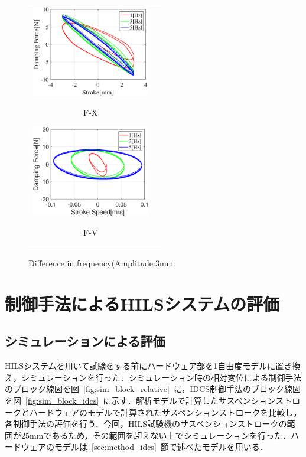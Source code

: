 \documentclass[a4paper,12pt]{article_vdlab_sotsuron}
\begin{document}
\vspace*{10mm}
\begin{figure}[h]
  \begin{tabular}{cc}
  \begin{minipage}{0.5\hsize}
  \begin{center}
    \includegraphics[height=40mm]{figure/damper_3_x_Fx.eps}
    \end{center}
    \begin{center}
    \ F-X\
    \end{center}
  \end{minipage}
  \begin{minipage}{0.5\hsize}
     \begin{center}
      \includegraphics[height=40mm]{figure/damper_3_x_Fv.eps}
      \end{center}
      \begin{center}
      \ F-V\
    \end{center}
  \end{minipage}
  \end{tabular}
  \vspace*{3mm}
  \caption{Difference in frequency(Amplitude:3mm}
    \label{fig:damper_3_x}
\end{figure}
\newpage

\section{制御手法によるHILSシステムの評価}
\subsection{シミュレーションによる評価}
HILSシステムを用いて試験をする前にハードウェア部を1自由度モデルに置き換え，シミュレーションを行った．シミュレーション時の相対変位による制御手法のブロック線図を図~\ref{fig:sim_block_relative}~に，IDCS制御手法のブロック線図を図~\ref{fig:sim_block_idcs}~に示す．解析モデルで計算したサスペンションストロークとハードウェアのモデルで計算されたサスペンションストロークを比較し，各制御手法の評価を行う．今回，HILS試験機のサスペンションストロークの範囲が25mmであるため，その範囲を超えない上でシミュレーションを行った．ハードウェアのモデルは~\ref{sec:method_idcs}~節で述べたモデルを用いる．
\end{document}
